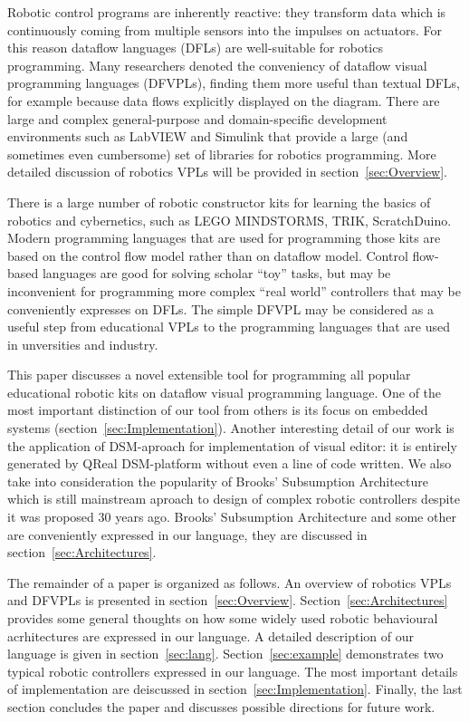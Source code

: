 \documentclass[conference,compsoc]{IEEEtran}
\begin{document}
Robotic control programs are inherently reactive: they transform data which is continuously coming from multiple sensors into the impulses on actuators. For this reason dataflow languages (DFLs) are well-suitable for robotics programming. Many researchers denoted the conveniency of dataflow visual programming languages (DFVPLs)\cite{johnston2004advances}, finding them more useful than textual DFLs, for example because data flows explicitly displayed on the diagram. There are large and complex general-purpose and domain-specific development environments such as LabVIEW\cite{labview} and Simulink\cite{simulink} that provide a large (and sometimes even cumbersome) set of libraries for robotics programming. More detailed discussion of robotics VPLs will be provided in section~\ref{sec:Overview}.

There is a large number of robotic constructor kits for learning the basics of robotics and cybernetics, such as LEGO MINDSTORMS\cite{legokit}, TRIK, ScratchDuino\cite{ScratchDuino}. Modern programming languages that are used for programming those kits are based on the control flow model rather than on dataflow model. Control flow-based languages are good for solving scholar ``toy'' tasks, but may be inconvenient for programming more complex ``real world'' controllers that may be conveniently expresses on DFLs. The simple DFVPL may be considered as a useful step from educational VPLs to the programming languages that are used in unversities and industry. 


This paper discusses a novel extensible tool for programming all popular educational robotic kits on dataflow visual programming language. One of the most important distinction of our tool from others is its focus on embedded systems (section~\ref{sec:Implementation}). Another interesting detail of our work is the application of DSM-aproach for implementation of visual editor: it is entirely generated by QReal DSM-platform\cite{qrealMeta}\cite{kuzenkova2013qreal} without even a line of code written. We also take into consideration the popularity of Brooks' Subsumption Architecture\cite{brooks1986robust} which is still mainstream aproach to design of complex robotic controllers\cite{banyasad2000visual,simpson2006mobile,posso2011process,proetzsch2007behaviour} despite it was proposed 30 years ago. Brooks' Subsumption Architecture and some other are conveniently expressed in our language, they are discussed in section~\ref{sec:Architectures}.

The remainder of a paper is organized as follows. An overview of robotics VPLs and DFVPLs is presented in section~\ref{sec:Overview}. Section~\ref{sec:Architectures} provides some general thoughts on how some widely used robotic behavioural acrhitectures are expressed in our language. A detailed description of our language is given in section~\ref{sec:lang}. Section~\ref{sec:example} demonstrates two typical robotic controllers expressed in our language. The most important details of implementation are deiscussed in section~\ref{sec:Implementation}. Finally, the last section concludes the paper and discusses possible directions for future work.
\end{document}
